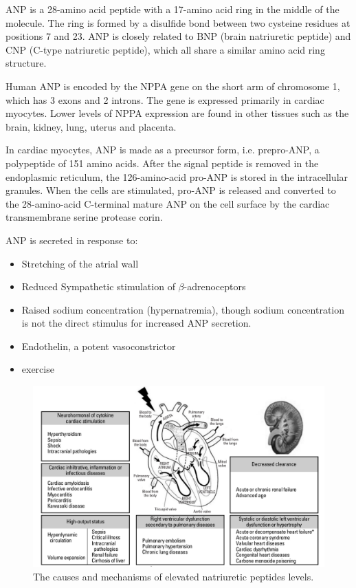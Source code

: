 \documentclass[14pt,a4paper,onecolumn]{article}
\begin{document}
ANP is a 28-amino acid peptide with a 17-amino acid ring in the middle of the molecule. The ring is formed by a disulfide bond between two cysteine residues at positions 7 and 23. ANP is closely related to BNP (brain natriuretic peptide) and CNP (C-type natriuretic peptide), which all share a similar amino acid ring structure.

Human ANP is encoded by the NPPA gene on the short arm of chromosome 1, which has 3 exons and 2 introns. The gene is expressed primarily in cardiac myocytes. Lower levels of NPPA expression are found in other tissues such as the brain, kidney, lung, uterus and placenta.

In cardiac myocytes, ANP is made as a precursor form, i.e. prepro-ANP, a polypeptide of 151 amino acids. After the signal peptide is removed in the endoplasmic reticulum, the 126-amino-acid pro-ANP is stored in the intracellular granules. When the cells are stimulated, pro-ANP is released and converted to the 28-amino-acid C-terminal mature ANP on the cell surface by the cardiac transmembrane serine protease corin.\citep{Yan1999}\citep{Yan2000}

ANP is secreted in response to:
    \begin{itemize}
        \item Stretching of the atrial wall \citep{Widmaier2008}
        \item Reduced Sympathetic stimulation of $\beta$-adrenoceptors
        \item Raised sodium concentration (hypernatremia), though sodium concentration is not the direct stimulus for increased ANP secretion. \citep{Widmaier2008}
        \item Endothelin, a potent vasoconstrictor
        \item exercise \citep{Kokkonen2002}
    \end{itemize}


\begin{figure}
    \includegraphics[scale=0.3]{./images/NP_causes.png}
    \caption{The causes and mechanisms of elevated natriuretic peptides levels.}
    \label{NP_causes}
\end{figure}
\end{document}

